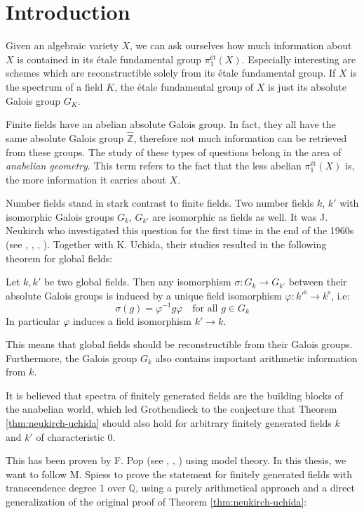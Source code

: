 \chapter{Introduction}

Given an algebraic variety $X$, we can ask ourselves how much information about $X$ is contained in its étale fundamental group $\pi_1^{\text{ét}}(X)$. Especially interesting are schemes which are reconstructible solely from its étale fundamental group. If $X$ is the spectrum of a field $K$, the étale fundamental group of $X$ is just its absolute Galois group $G_K$. 

Finite fields have an abelian absolute Galois group. In fact, they all have the same absolute Galois group $\hat{\mathbb{Z}}$, therefore not much information can be retrieved from these groups. The study of these types of questions belong in the area of \textit{anabelian geometry}. This term refers to the fact that the less abelian $\pi_1^\text{ét}(X)$ is, the more information it carries about $X$.

Number fields stand in stark contrast to finite fields. Two number fields $k$, $k'$ with isomorphic Galois groups $G_k$, $G_{k'}$ are isomorphic as fields as well. It was J. Neukirch who investigated this question for the first time in the end of the 1960s (see \cite{Ne69}, \cite{Uc76}, \cite{Ne77}, \cite{Uc77}). Together with K. Uchida, their studies resulted in the following theorem for global fields:

\begin{theorem}\label{thm:neukirch-uchida}
Let $k,k'$ be two global fields. Then any isomorphism $\sigma: G_k\to G_{k'}$ between their absolute Galois groups is induced by a unique field isomorphism $\varphi: k'^{\text{s}}\to k^\text{s}$, i.e: 
\[\sigma(g) =\varphi^{-1}g\varphi \quad \text{for all }g\in G_k\] 
In particular $\varphi$ induces a field isomorphism $k'\to k$.
\end{theorem}

This means that global fields should be reconstructible from their Galois groups. Furthermore, the Galois group $G_k$ also contains important arithmetic information from $k$. 

It is believed that spectra of finitely generated fields are the building blocks of the anabelian world, which led Grothendieck to the conjecture that Theorem \ref{thm:neukirch-uchida} should also hold for arbitrary finitely generated fields $k$ and $k'$ of characteristic $0$.

This has been proven by F. Pop (see \cite{Po90}, \cite{Po94}, \cite{Po95}) using model theory. In this thesis, we want to follow M. Spiess \cite{Sp96} to prove the statement for finitely generated fields with transcendence degree $1$ over $\mathbb{Q}$, using a purely arithmetical approach and a direct generalization of the original proof of Theorem \ref{thm:neukirch-uchida}:

